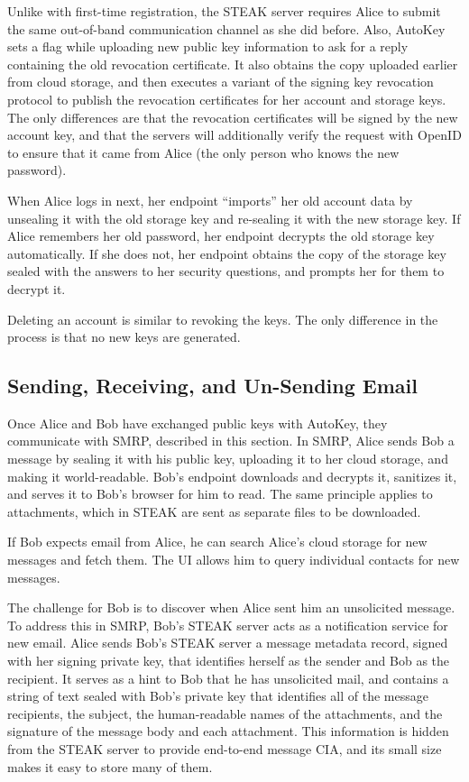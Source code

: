 Unlike with first-time registration, the STEAK server requires Alice to submit the same out-of-band communication channel as she did before.  Also, AutoKey sets a flag while uploading new public key information to ask for a reply containing the old revocation certificate.  It also obtains the copy uploaded earlier from cloud storage, and then executes a variant of the signing key revocation protocol to publish the revocation certificates for her account and storage keys.  The only differences are that the revocation certificates will be signed by the new account key, and that the servers will additionally verify the request with OpenID to ensure that it came from Alice (the only person who knows the new password).

When Alice logs in next, her endpoint “imports” her old account data by unsealing it with the old storage key and re-sealing it with the new storage key.  If Alice remembers her old password, her endpoint decrypts the old storage key automatically.  If she does not, her endpoint obtains the copy of the storage key sealed with the answers to her security questions, and prompts her for them to decrypt it.

Deleting an account is similar to revoking the keys.  The only difference in the process is that no new keys are generated.

\subsection{Sending, Receiving, and Un-Sending Email}
Once Alice and Bob have exchanged public keys with AutoKey, they communicate with SMRP, described in this section.  In SMRP, Alice sends Bob a message by sealing it with his public key, uploading it to her cloud storage, and making it world-readable. Bob’s endpoint downloads and decrypts it, sanitizes it, and serves it to Bob’s browser for him to read. The same principle applies to attachments, which in STEAK are sent as separate files to be downloaded.

If Bob expects email from Alice, he can search Alice’s cloud storage for new messages and fetch them.  The UI allows him to query individual contacts for new messages.

The challenge for Bob is to discover when Alice sent him an unsolicited message.  To address this in SMRP, Bob’s STEAK server acts as a notification service for new email.  Alice sends Bob's STEAK server a message metadata record, signed with her signing private key, that identifies herself as the sender and Bob as the recipient.  It serves as a hint to Bob that he has unsolicited mail, and contains a string of text sealed with Bob’s private key that identifies all of the message recipients, the subject, the human-readable names of the attachments, and the signature of the message body and each attachment.  This information is hidden from the STEAK server to provide end-to-end message CIA, and its small size makes it easy to store many of them.


